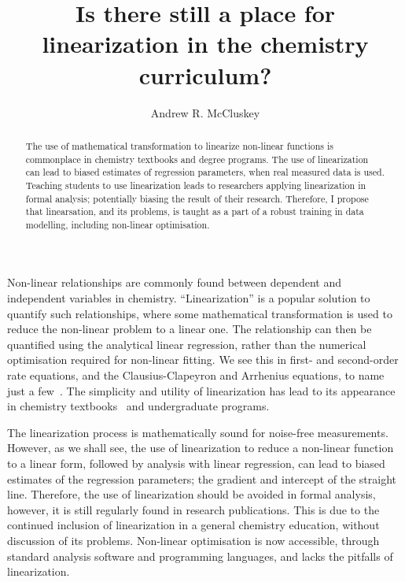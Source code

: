 \documentclass[reprint,superscriptaddress,nobibnotes,amsmath,amssymb]{revtex4-2}
\begin{document}
\title{Is there still a place for linearization in the chemistry curriculum?}

\author{Andrew R. McCluskey}

\begin{abstract}
    The use of mathematical transformation to linearize non-linear functions is commonplace in chemistry textbooks and degree programs. 
    The use of linearization can lead to biased estimates of regression parameters, when real measured data is used. 
    Teaching students to use linearization leads to researchers applying linearization in formal analysis; potentially biasing the result of their research. 
    Therefore, I propose that linearsation, and its problems, is taught as a part of a robust training in data modelling, including non-linear optimisation.  
\end{abstract}

\maketitle 

Non-linear relationships are commonly found between dependent and independent variables in chemistry. 
``Linearization'' is a popular solution to quantify such relationships, where some mathematical transformation is used to reduce the non-linear problem to a linear one. 
The relationship can then be quantified using the analytical linear regression, rather than the numerical optimisation required for non-linear fitting. 
We see this in first- and second-order rate equations, and the Clausius-Clapeyron and Arrhenius equations, to name just a few~\cite{perrin_linear_2017,harper_data_2017,monk_math_2010}.
The simplicity and utility of linearization has lead to its appearance in chemistry textbooks~\cite{monk_math_2010,atkins_physical_2018} and undergraduate programs. 

The linearization process is mathematically sound for noise-free measurements. 
However, as we shall see, the use of linearization to reduce a non-linear function to a linear form, followed by analysis with linear regression, can lead to biased estimates of the regression parameters; the gradient and intercept of the straight line. 
Therefore, the use of linearization should be avoided in formal analysis, however, it is still regularly found in research publications. 
This is due to the continued inclusion of linearization in a general chemistry education, without discussion of its problems. 
Non-linear optimisation is now accessible, through standard analysis software and programming languages, and lacks the pitfalls of linearization. 
\end{document}
